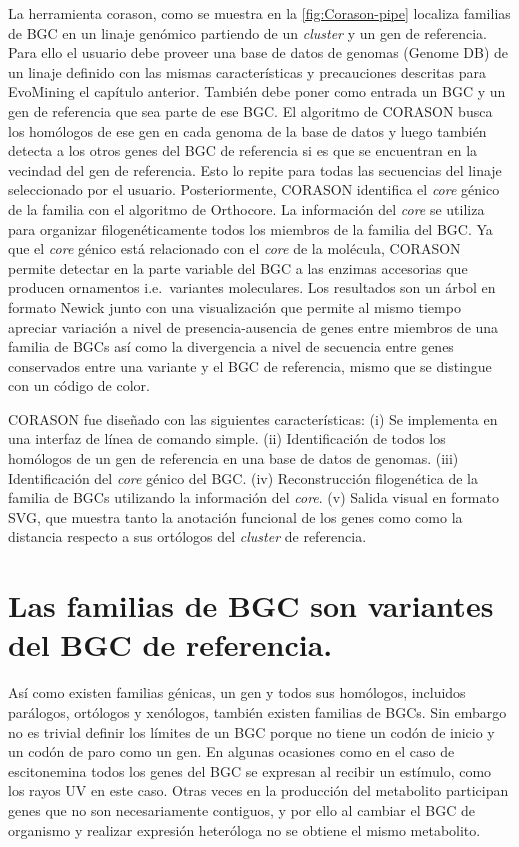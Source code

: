 \documentclass[12pt,twoside]{reedthesis}
\begin{document}
  La herramienta corason, como se muestra en la \autoref{fig:Corason-pipe}
  localiza familias de BGC en un linaje genómico partiendo de un
  \emph{cluster} y un gen de referencia. Para ello el usuario debe proveer
  una base de datos de genomas (Genome DB) de un linaje definido con las
  mismas características y precauciones descritas para EvoMining el
  capítulo anterior. También debe poner como entrada un BGC y un gen de
  referencia que sea parte de ese BGC. El algoritmo de CORASON busca los
  homólogos de ese gen en cada genoma de la base de datos y luego también
  detecta a los otros genes del BGC de referencia si es que se encuentran
  en la vecindad del gen de referencia. Esto lo repite para todas las
  secuencias del linaje seleccionado por el usuario. Posteriormente,
  CORASON identifica el \emph{core} génico de la familia con el algoritmo
  de Orthocore. La información del \emph{core} se utiliza para organizar
  filogenéticamente todos los miembros de la familia del BGC. Ya que el
  \emph{core} génico está relacionado con el \emph{core} de la molécula,
  CORASON permite detectar en la parte variable del BGC a las enzimas
  accesorias que producen ornamentos i.e.~variantes moleculares. Los
  resultados son un árbol en formato Newick junto con una visualización
  que permite al mismo tiempo apreciar variación a nivel de
  presencia-ausencia de genes entre miembros de una familia de BGCs así
  como la divergencia a nivel de secuencia entre genes conservados entre
  una variante y el BGC de referencia, mismo que se distingue con un
  código de color.
  
  CORASON fue diseñado con las siguientes características: (i) Se
  implementa en una interfaz de línea de comando simple. (ii)
  Identificación de todos los homólogos de un gen de referencia en una
  base de datos de genomas. (iii) Identificación del \emph{core} génico
  del BGC. (iv) Reconstrucción filogenética de la familia de BGCs
  utilizando la información del \emph{core}. (v) Salida visual en formato
  SVG, que muestra tanto la anotación funcional de los genes como como la
  distancia respecto a sus ortólogos del \emph{cluster} de referencia.
  
  \section{Las familias de BGC son variantes del BGC de
  referencia.}\label{las-familias-de-bgc-son-variantes-del-bgc-de-referencia.}
  
  Así como existen familias génicas, un gen y todos sus homólogos,
  incluidos parálogos, ortólogos y xenólogos, también existen familias de
  BGCs. Sin embargo no es trivial definir los límites de un BGC porque no
  tiene un codón de inicio y un codón de paro como un gen. En algunas
  ocasiones como en el caso de escitonemina todos los genes del BGC se
  expresan al recibir un estímulo, como los rayos UV en este caso. Otras
  veces en la producción del metabolito participan genes que no son
  necesariamente contiguos, y por ello al cambiar el BGC de organismo y
  realizar expresión heteróloga no se obtiene el mismo metabolito.
  
\end{document}
